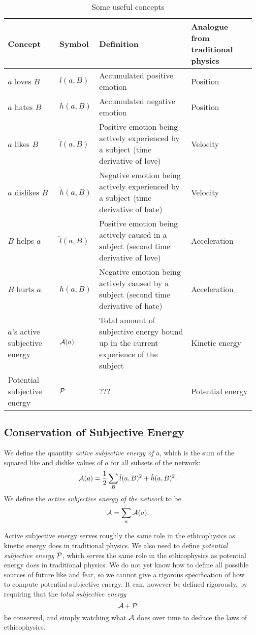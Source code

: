 \documentclass{article}
\begin{document}
\begin{table}
\label{tab-concepts}
\begin{tabular}[c]{|m{0.75in}|m{0.5in}|m{2in}|m{0.75in}|}
\hline
Concept & Symbol & Definition & Analogue from traditional physics\\
\hline
$a$ loves $B$ & $l(a, B)$ & Accumulated positive emotion & Position\\
\hline
$a$ hates $B$ & $h(a, B)$ & Accumulated negative emotion & Position\\
\hline
$a$ likes $B$ & $\dot{l}(a, B)$ & Positive emotion being actively experienced by a subject (time derivative of love) & Velocity\\
\hline
$a$ dislikes $B$ & $\dot{h}(a, B)$ & Negative emotion being actively experienced by a subject (time derivative of hate) & Velocity\\
\hline
$B$ helps $a$ & $\ddot{l}(a, B)$ & Positive emotion being actively caused in a subject (second time derivative of love) 
 & Acceleration\\
\hline
$B$ hurts $a$ & $\ddot{h}(a, B)$ & Negative emotion being actively caused by a subject (second time derivative of hate) 
 & Acceleration\\
\hline
$a$'s active subjective energy & ${\mathcal A}(a)$ & Total amount of subjective energy bound up in the current experience of the subject
& Kinetic energy \\
\hline
Potential subjective energy & ${\mathcal P}$ & ???
& Potential energy \\
\hline
\end{tabular}
\caption{Some useful concepts}
\end{table}

\subsection{Conservation of Subjective Energy}

We define the quantity {\em active subjective energy of $a$}, which is
the sum of the squared like and dislike values of $a$ for all subsets of
the network:
$${\mathcal A}(a) = \frac{1}{2} \sum_B \dot{l}(a, B)^2 + \dot{h}(a, B)^2.$$ 
We define the {\em active subjective energy of the network} to be
$${\mathcal A} = \sum_a {\mathcal A}(a).$$ 

Active subjective energy serves roughly the same role in the
ethicophysics as kinetic energy does in traditional physics. We also
need to define {\em potential subjective energy} ${\mathcal P}$, which
serves the same role in the ethicophysics as potential energy does in
traditional physics. We do not yet know how to define all possible
sources of future like and fear, so we cannot give a rigorous
specification of how to compute potential subjective energy. It can,
however be defined rigorously, by requiring that the {\em total
  subjective energy}
$${\mathcal A} + {\mathcal P}$$ be conserved, and simply watching what ${\mathcal A}$ does
over time to deduce the laws of ethicophysics.
\end{document}
